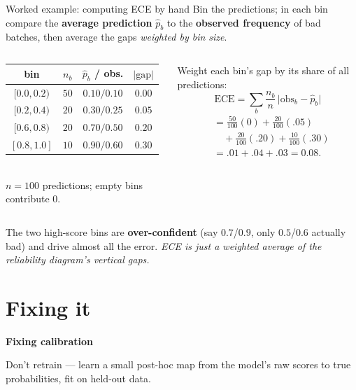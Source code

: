 \documentclass[aspectratio=169]{beamer}
\begin{document}
\begin{frame}{Worked example: computing ECE by hand}
  Bin the predictions; in each bin compare the \textbf{average prediction} $\hat p_b$ to the
  \textbf{observed frequency} of bad batches, then average the gaps \emph{weighted by bin size}.
  \begin{columns}[T]
    \begin{center}\small
      \renewcommand{\arraystretch}{1.25}
      \begin{tabular}{c c c c}
        bin & $n_b$ & $\hat p_b$ / obs. & $|\mathrm{gap}|$ \\
        \hline
        $[0.0,0.2)$ & $50$ & $0.10 / 0.10$ & $0.00$ \\
        $[0.2,0.4)$ & $20$ & $0.30 / 0.25$ & $0.05$ \\
        $[0.6,0.8)$ & $20$ & $0.70 / 0.50$ & $0.20$ \\
        $[0.8,1.0]$ & $10$ & $0.90 / 0.60$ & $0.30$ \\
        \hline
      \end{tabular}\\[3pt]
      \scriptsize $n=100$ predictions; empty bins contribute $0$.
    \end{center}
    \small Weight each bin's gap by its share of all predictions:
    \[ \mathrm{ECE} = \sum_b \frac{n_b}{n}\,\big|\mathrm{obs}_b - \hat p_b\big| \]
    \begin{align*}
      &= \tfrac{50}{100}(0) + \tfrac{20}{100}(.05) \\
      &\quad + \tfrac{20}{100}(.20) + \tfrac{10}{100}(.30) \\[2pt]
      &= .01 + .04 + .03 = \mathbf{0.08}.
    \end{align*}
  \end{columns}
  \vskip 2pt
  \footnotesize The two high-score bins are \textbf{over-confident} (say $0.7$/$0.9$, only
  $0.5$/$0.6$ actually bad) and drive almost all the error. \emph{ECE is just a weighted average
  of the reliability diagram's vertical gaps.}
\end{frame}

\section{Fixing it}

\begin{frame}[plain]
  \vfill
  \begin{center}
    {\Large\color{popblue}\textbf{Fixing calibration}}\\[0.9em]
    \begin{minipage}{0.82\textwidth}\centering\small
      Don't retrain --- learn a small post-hoc map from the model's raw scores to true
      probabilities, fit on held-out data.
    \end{minipage}
  \end{center}
  \vfill
\end{frame}
\end{document}
